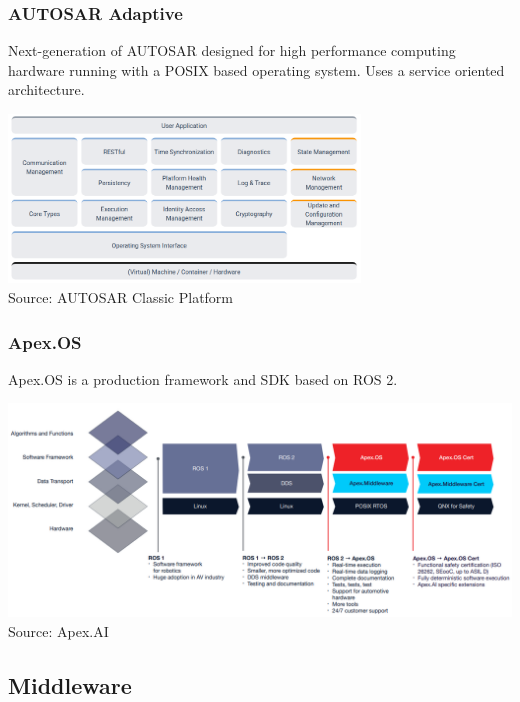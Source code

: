 \begin{frame}
\frametitle{AUTOSAR Adaptive}
Next-generation of AUTOSAR designed for high performance computing hardware
running with a POSIX based operating system. Uses a service oriented
architecture.
\begin{center}
\includegraphics[width=0.7\textwidth]{images/autosar_adaptive.png}\\
\footnotesize Source: AUTOSAR Classic Platform\footnotemark[1]
\end{center}
\end{frame}

\begin{frame}
\frametitle{Apex.OS}
Apex.OS is a production framework and SDK based on ROS 2.
\begin{center}
\includegraphics[width=\textwidth]{images/apex_ros_to_apexos.png}\\
\scriptsize Source: Apex.AI
\end{center}
\end{frame}

\subsection{Middleware}

